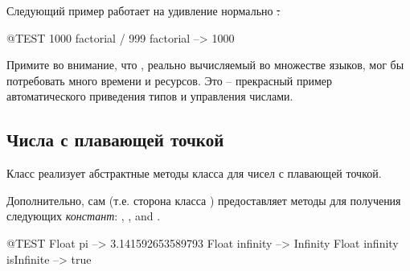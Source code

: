 \documentclass[a4paper,10pt,twoside]{book}
\begin{document}
Следующий пример работает на удивление нормально \st:
\begin{code}{@TEST}
1000 factorial / 999 factorial --> 1000
\end{code}
Примите во внимание, что , реально вычисляемый во множестве языков, мог бы потребовать много времени и ресурсов. Это -- прекрасный пример автоматического приведения типов и управления числами.


\subsection{Числа с плавающей точкой}

Класс  реализует абстрактные методы класса  для чисел с плавающей точкой.

Дополнительно, сам  (т.е. сторона класса ) предоставляет методы для получения следующих \emph{констант}: , ,  and .

\begin{code}{@TEST}
Float pi                      --> 3.141592653589793
Float infinity               --> Infinity
Float infinity isInfinite --> true
\end{code}
\end{document}
